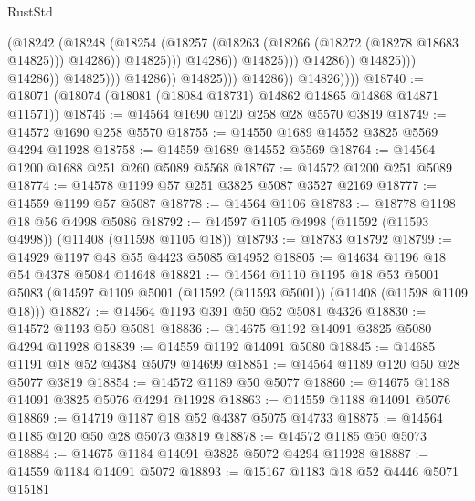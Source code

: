 \begin{lexlean}{RustStd}
\begin{coremodule}
                                                        (@18242
                                                          (@18248
                                                            (@18254
                                                              (@18257
                                                                (@18263
                                                                  (@18266
                                                                    (@18272 (@18278 @18683 @14825)))
                                                                  @14286))
                                                              @14825)))
                                                        @14286))
                                                    @14825)))
                                              @14286))
                                          @14825)))
                                    @14286))
                                @14825)))
                          @14286))
                      @14825)))
                @14286))
            @14826))))
@18740 := @18071 (@18074 (@18081 (@18084 @18731) @14862 @14865 @14868 @14871 @11571))
@18746 := @14564 @1690 @120 @258 @28 @5570 @3819
@18749 := @14572 @1690 @258 @5570
@18755 := @14550 @1689 @14552 @3825 @5569 @4294 @11928
@18758 := @14559 @1689 @14552 @5569
@18764 := @14564 @1200 @1688 @251 @260 @5089 @5568
@18767 := @14572 @1200 @251 @5089
@18774 := @14578 @1199 @57 @251 @3825 @5087 @3527 @2169
@18777 := @14559 @1199 @57 @5087
@18778 := @14564 @1106
@18783 := @18778 @1198 @18 @56 @4998 @5086
@18792 := @14597 @1105 @4998 (@11592 (@11593 @4998)) (@11408 (@11598 @1105 @18))
@18793 := @18783 @18792
@18799 := @14929 @1197 @48 @55 @4423 @5085 @14952
@18805 := @14634 @1196 @18 @54 @4378 @5084 @14648
@18821 := @14564
    @1110
    @1195
    @18
    @53
    @5001
    @5083
    (@14597 @1109 @5001 (@11592 (@11593 @5001)) (@11408 (@11598 @1109 @18)))
@18827 := @14564 @1193 @391 @50 @52 @5081 @4326
@18830 := @14572 @1193 @50 @5081
@18836 := @14675 @1192 @14091 @3825 @5080 @4294 @11928
@18839 := @14559 @1192 @14091 @5080
@18845 := @14685 @1191 @18 @52 @4384 @5079 @14699
@18851 := @14564 @1189 @120 @50 @28 @5077 @3819
@18854 := @14572 @1189 @50 @5077
@18860 := @14675 @1188 @14091 @3825 @5076 @4294 @11928
@18863 := @14559 @1188 @14091 @5076
@18869 := @14719 @1187 @18 @52 @4387 @5075 @14733
@18875 := @14564 @1185 @120 @50 @28 @5073 @3819
@18878 := @14572 @1185 @50 @5073
@18884 := @14675 @1184 @14091 @3825 @5072 @4294 @11928
@18887 := @14559 @1184 @14091 @5072
@18893 := @15167 @1183 @18 @52 @4446 @5071 @15181

\end{coremodule}
\end{lexlean}
